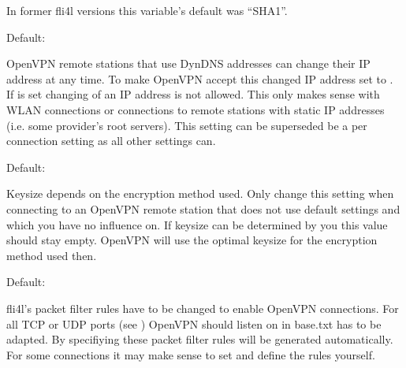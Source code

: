 \begin{description}

  In former fli4l versions this variable's default was ``SHA1''.


  Default: 

  OpenVPN remote stations that use DynDNS addresses can change their IP address 
  at any time. To make OpenVPN accept this changed IP address set 
   to . If  is set 
  changing of an IP address is not allowed. This only makes sense with WLAN 
  connections or connections to remote stations with static IP addresses 
  (i.e. some provider's root servers). This setting can be superseded be a 
  per connection setting as all other  settings can. 


  Default: 

  Keysize depends on the encryption method used. Only change this setting when 
  connecting to an OpenVPN remote station that does not use default settings 
  and which you have no influence on. If keysize can be determined by you this 
  value should stay empty. OpenVPN will use the optimal keysize for the 
  encryption method used then.


  Default: 

  fli4l's packet filter rules have to be changed to enable OpenVPN connections. 
  For all TCP or UDP ports (see ) OpenVPN should listen 
  on  in base.txt has to be adapted. By 
  specifiying  these packet filter rules will be generated 
  automatically. For some connections it may make sense to set  
  and define the rules yourself.


\end{description}
